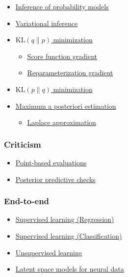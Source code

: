 \begin{itemize}
  \item \href{tut_inference}{Inference of probability models}
  \item \href{tut_variational_inference}{Variational inference}
  \item \href{tut_KLqp}{$\text{KL}(q\|p)$ minimization}
  \begin{itemize}
    \item \href{tut_KLqp_score}{Score function gradient}
    \item \href{tut_KLqp_reparam}{Reparameterization gradient}
  \end{itemize}
  \item \href{tut_KLpq}{$\text{KL}(p\|q)$ minimization}
  \item \href{tut_MAP}{Maximum a posteriori estimation}
  \begin{itemize}
    \item \href{tut_MAP_Laplace}{Laplace approximation}
  \end{itemize}
\end{itemize}

\subsubsection{Criticism}

\begin{itemize}
  \item \href{tut_point_eval}{Point-based evaluations}
  \item \href{tut_PPC}{Posterior predictive checks}
\end{itemize}

\subsubsection{End-to-end}

\begin{itemize}
  \item \href{tut_supervised_regression}{Supervised learning (Regression)}
  \item \href{tut_supervised_classification}{Supervised learning (Classification)}
  \item \href{tut_unsupervised}{Unsupervised learning}
  \item \href{tut_latent_space_models}{Latent space models for neural data}
\end{itemize}
